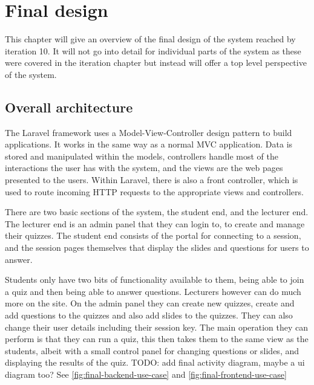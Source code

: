 \chapter{Final design}
This chapter will give an overview of the final design of the system reached by iteration 10. It will not go into detail for individual parts of the system as these were covered in the iteration chapter but instead will offer a top level perspective of the system.

\section{Overall architecture}
The Laravel framework uses a Model-View-Controller design pattern\cite{mvc} to build applications. It works in the same way as a normal MVC application. Data is stored and manipulated within the models, controllers handle most of the interactions the user has with the system, and the views are the web pages presented to the users. Within Laravel, there is also a front controller, which is used to route incoming HTTP requests to the appropriate views and controllers\cite{Laravel-architechture}.

There are two basic sections of the system, the student end, and the lecturer end. The lecturer end is an admin panel that they can login to, to create and manage their quizzes. The student end consists of the portal for connecting to a session, and the session pages themselves that display the slides and questions for users to answer.

Students only have two bits of functionality available to  them, being able to join a quiz and then being able to answer questions. Lecturers however can do much more on the site. On the admin panel they can create new quizzes, create and add questions to the quizzes and also add slides to the quizzes. They can also change their user details including their session key. The main operation they can perform is that they can run a quiz, this then takes them to the same view as the students, albeit with a small control panel for changing questions or slides, and displaying the results of the quiz. TODO: add final activity diagram, maybe a ui diagram too? See \ref{fig:final-backend-use-case} and \ref{fig:final-frontend-use-case}


